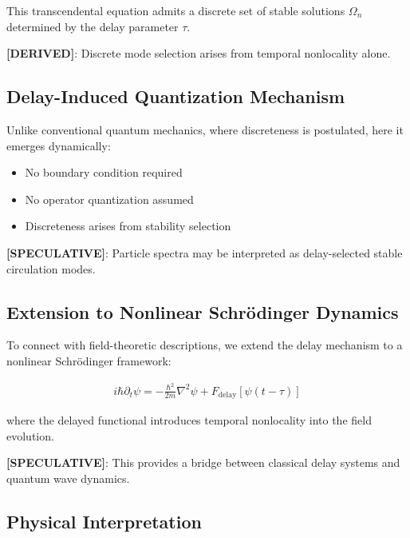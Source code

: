 \documentclass[11pt]{article}
\theoremstyle{definition}
\theoremstyle{plain}
\theoremstyle{remark}
\begin{document}
        This transcendental equation admits a discrete set of stable solutions $\Omega_n$ determined by the delay parameter $\tau$.
        
        \textbf{[DERIVED]}: Discrete mode selection arises from temporal nonlocality alone.
    
    \subsection{Delay-Induced Quantization Mechanism}
        
        Unlike conventional quantum mechanics, where discreteness is postulated, here it emerges dynamically:
        
        \begin{itemize}
            \item No boundary condition required
            \item No operator quantization assumed
            \item Discreteness arises from stability selection
        \end{itemize}
        
        \textbf{[SPECULATIVE]}: Particle spectra may be interpreted as delay-selected stable circulation modes.
    
    \subsection{Extension to Nonlinear Schrödinger Dynamics}
        
        To connect with field-theoretic descriptions, we extend the delay mechanism to a nonlinear Schrödinger framework:
        
        \begin{align}
            i \hbar \partial_t \psi = -\frac{\hbar^2}{2m} \nabla^2 \psi + F_{\text{delay}}[\psi(t - \tau)]
        \end{align}
        
        where the delayed functional introduces temporal nonlocality into the field evolution.
        
        \textbf{[SPECULATIVE]}: This provides a bridge between classical delay systems and quantum wave dynamics.
    
    \subsection{Physical Interpretation}
        
\end{document}
